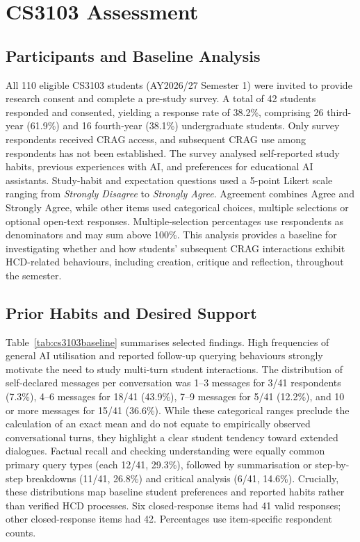 \documentclass[conference]{IEEEtran}
\begin{document}
\section{CS3103 Assessment}
\subsection{Participants and Baseline Analysis}
All 110 eligible CS3103 students (AY2026/27 Semester 1) were invited to provide research consent and complete a pre-study survey. A total of 42 students responded and consented, yielding a response rate of 38.2\%, comprising 26 third-year (61.9\%) and 16 fourth-year (38.1\%) undergraduate students. Only survey respondents received CRAG access, and subsequent CRAG use among respondents has not been established.
The survey analysed self-reported study habits, previous experiences with AI, and preferences for educational AI assistants. Study-habit and expectation questions used a 5-point Likert scale ranging from \textit{Strongly Disagree} to \textit{Strongly Agree}. Agreement combines Agree and Strongly Agree, while other items used categorical choices, multiple selections or optional open-text responses. Multiple-selection percentages use respondents as denominators and may sum above 100\%. 
This analysis provides a baseline for investigating whether and how students' subsequent CRAG interactions exhibit HCD-related behaviours, including creation, critique and reflection, throughout the semester.


\subsection{Prior Habits and Desired Support}
Table~\ref{tab:cs3103baseline} summarises selected findings. High frequencies of general AI utilisation and reported follow-up querying behaviours strongly motivate the need to study multi-turn student interactions. The distribution of self-declared messages per conversation was 1--3 messages for 3/41 respondents (7.3\%), 4--6 messages for 18/41 (43.9\%), 7--9 messages for 5/41 (12.2\%), and 10 or more messages for 15/41 (36.6\%). While these categorical ranges preclude the calculation of an exact mean and do not equate to empirically observed conversational turns, they highlight a clear student tendency toward extended dialogues. Factual recall and
checking understanding were equally common primary query types
(each 12/41, 29.3\%), followed by summarisation or step-by-step
breakdowns (11/41, 26.8\%) and critical analysis (6/41, 14.6\%). Crucially, these distributions map baseline student preferences and reported habits rather than verified HCD processes.
Six closed-response items had 41 valid responses; other closed-response items had 42. Percentages use item-specific respondent counts.
\end{document}
